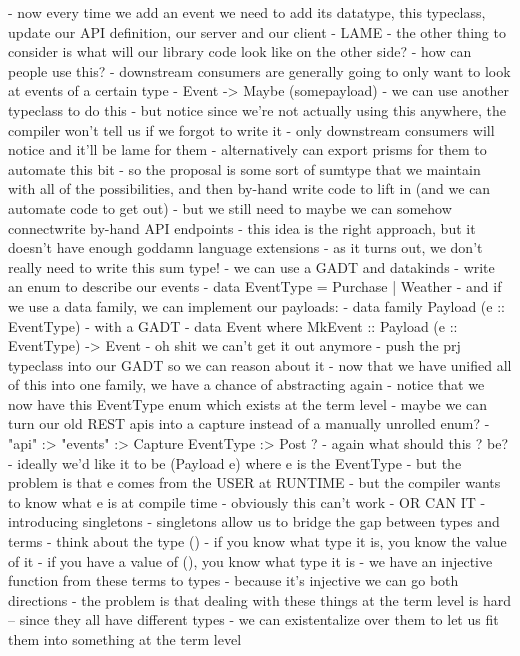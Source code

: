     - now every time we add an event we need to add its datatype, this typeclass, update our API definition, our server and our client
      - LAME
  - the other thing to consider is what will our library code look like on the other side?
    - how can people use this?
    - downstream consumers are generally going to only want to look at events of a certain type
    - Event -> Maybe (somepayload)
      - we can use another typeclass to do this
      - but notice since we're not actually using this anywhere, the compiler won't tell us if we forgot to write it
        - only downstream consumers will notice and it'll be lame for them
    - alternatively can export prisms for them to automate this bit
- so the proposal is some sort of sumtype that we maintain with all of the possibilities, and then by-hand write code to lift in (and we can automate code to get out)
  - but we still need to maybe we can somehow connectwrite by-hand API endpoints
- this idea is the right approach, but it doesn't have enough goddamn language extensions
- as it turns out, we don't really need to write this sum type!
  - we can use a GADT and datakinds
  - write an enum to describe our events
    - data EventType = Purchase | Weather
  - and if we use a data family, we can implement our payloads:
    - data family Payload (e :: EventType)
  - with a GADT
    - data Event where MkEvent :: Payload (e :: EventType) -> Event
  - oh shit we can't get it out anymore
    - push the prj typeclass into our GADT so we can reason about it
- now that we have unified all of this into one family, we have a chance of abstracting again
  - notice that we now have this EventType enum which exists at the term level
  - maybe we can turn our old REST apis into a capture instead of a manually unrolled enum?
  - "api" :> "events" :> Capture EventType :> Post ?
    - again what should this ? be?
    - ideally we'd like it to be (Payload e) where e is the EventType
    - but the problem is that e comes from the USER at RUNTIME
    - but the compiler wants to know what e is at compile time
  - obviously this can't work
- OR CAN IT
  - introducing singletons
  - singletons allow us to bridge the gap between types and terms
  - think about the type ()
    - if you know what type it is, you know the value of it
    - if you have a value of (), you know what type it is
    - we have an injective function from these terms to types
      - because it's injective we can go both directions
  - the problem is that dealing with these things at the term level is hard -- since they all have different types
    - we can existentalize over them to let us fit them into something at the term level
